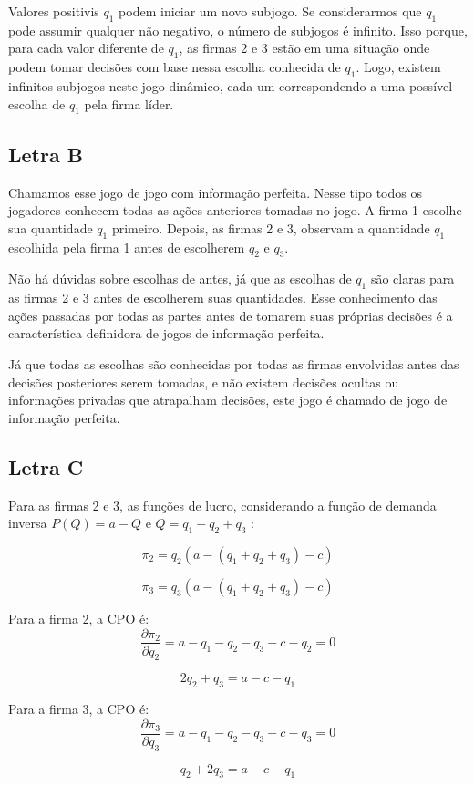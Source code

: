 \documentclass[a4paper,12pt]{article}[abntex2]
\begin{document}
Valores positivis \( q_1 \) podem iniciar um novo subjogo. Se considerarmos que \( q_1 \) pode assumir qualquer não negativo, o número de subjogos é infinito. Isso  porque, para cada valor diferente de \( q_1 \), as firmas 2 e 3 estão em uma situação onde podem tomar  decisões com base nessa escolha conhecida de \( q_1 \). Logo, existem infinitos subjogos neste jogo dinâmico, cada um correspondendo a uma possível escolha de \( q_1 \) pela firma líder.

\subsection{\textbf{Letra B}}
Chamamos esse jogo de jogo com informação perfeita. Nesse tipo todos os jogadores conhecem todas as ações anteriores tomadas no jogo. A firma 1 escolhe sua quantidade \( q_1 \) primeiro. Depois, as firmas 2 e 3, observam a quantidade \( q_1 \) escolhida pela firma 1 antes de escolherem \( q_2 \) e \( q_3 \). 

Não há dúvidas sobre escolhas de antes, já que as escolhas de \( q_1 \) são claras para as firmas 2 e 3 antes de escolherem suas quantidades. Esse conhecimento das ações passadas por todas as partes antes de tomarem suas próprias decisões é a característica definidora de jogos de informação perfeita.

Já que todas as escolhas são conhecidas por todas as firmas envolvidas antes das decisões posteriores serem tomadas, e não existem decisões ocultas ou informações privadas que atrapalham decisões, este jogo é chamado de jogo de informação perfeita.

\subsection{\textbf{Letra C}}
Para as firmas 2 e 3, as funções de lucro, considerando a função de demanda inversa \(P(Q) = a - Q\) e \(Q = q_1 + q_2 + q_3\) :

\[\pi_2 = q_2 \left(a - (q_1 + q_2 + q_3) - c\right)\]

\[\pi_3 = q_3 \left(a - (q_1 + q_2 + q_3) - c\right)\]

Para a firma 2, a CPO é:
\[\frac{\partial \pi_2}{\partial q_2} = a - q_1 - q_2 - q_3 - c - q_2 = 0\]

\[2q_2 + q_3 = a - c - q_1\]

Para a firma 3, a CPO é:
\[\frac{\partial \pi_3}{\partial q_3} = a - q_1 - q_2 - q_3 - c - q_3 = 0\]

\[q_2 + 2q_3 = a - c - q_1\]
\end{document}
